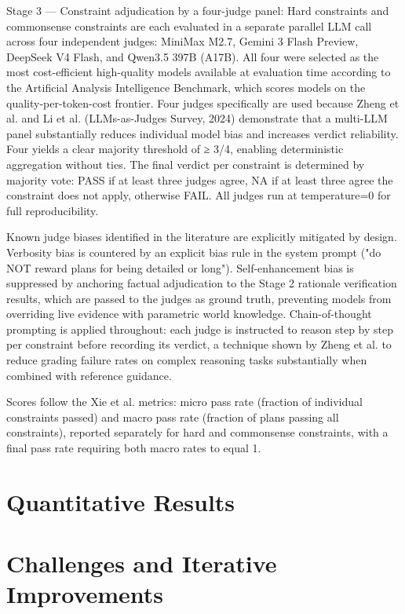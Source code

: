 \documentclass[a4paper,oneside,bibliography=totoc]{scrbook}
\begin{document}
Stage 3 — Constraint adjudication by a four-judge panel: Hard constraints and commonsense constraints are each evaluated in a separate parallel LLM call across four independent judges: MiniMax M2.7, Gemini 3 Flash Preview, DeepSeek V4 Flash, and Qwen3.5 397B (A17B). All four were selected as the most cost-efficient high-quality models available at evaluation time according to the Artificial Analysis Intelligence Benchmark, which scores models on the quality-per-token-cost frontier. Four judges specifically are used because Zheng et al. and Li et al. (LLMs-as-Judges Survey, 2024) demonstrate that a multi-LLM panel substantially reduces individual model bias and increases verdict reliability. Four yields a clear majority threshold of ≥ 3/4, enabling deterministic aggregation without ties. The final verdict per constraint is determined by majority vote: PASS if at least three judges agree, NA if at least three agree the constraint does not apply, otherwise FAIL. All judges run at temperature=0 for full reproducibility.

Known judge biases identified in the literature are explicitly mitigated by design. Verbosity bias is countered by an explicit bias rule in the system prompt ("do NOT reward plans for being detailed or long"). Self-enhancement bias is suppressed by anchoring factual adjudication to the Stage 2 rationale verification results, which are passed to the judges as ground truth, preventing models from overriding live evidence with parametric world knowledge. Chain-of-thought prompting is applied throughout: each judge is instructed to reason step by step per constraint before recording its verdict, a technique shown by Zheng et al. to reduce grading failure rates on complex reasoning tasks substantially when combined with reference guidance.

Scores follow the Xie et al. metrics: micro pass rate (fraction of individual constraints passed) and macro pass rate (fraction of plans passing all constraints), reported separately for hard and commonsense constraints, with a final pass rate requiring both macro rates to equal 1.


\section{Quantitative Results}
\label{sec:eval:results}

\section{Challenges and Iterative Improvements}
\label{sec:eval:challenges}
\end{document}
